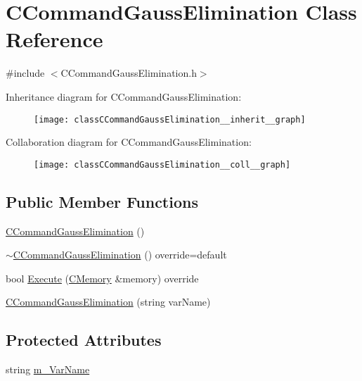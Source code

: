 \hypertarget{classCCommandGaussElimination}{}\section{C\+Command\+Gauss\+Elimination Class Reference}
\label{classCCommandGaussElimination}


{\ttfamily \#include $<$C\+Command\+Gauss\+Elimination.\+h$>$}



Inheritance diagram for C\+Command\+Gauss\+Elimination\+:\nopagebreak
\begin{figure}[H]
\begin{center}
\leavevmode
\texttt{[image: classCCommandGaussElimination\_\_inherit\_\_graph]}
\end{center}
\end{figure}


Collaboration diagram for C\+Command\+Gauss\+Elimination\+:\nopagebreak
\begin{figure}[H]
\begin{center}
\leavevmode
\texttt{[image: classCCommandGaussElimination\_\_coll\_\_graph]}
\end{center}
\end{figure}
\subsection*{Public Member Functions}
\begin{DoxyCompactItemize}
\item 
\hyperlink{classCCommandGaussElimination_aefc96f03e386afebdadef7225bba3743}{C\+Command\+Gauss\+Elimination} ()
\item 
\hyperlink{classCCommandGaussElimination_ad694b87633ac4281f102487dcc24dd07}{$\sim$\+C\+Command\+Gauss\+Elimination} () override=default
\item 
bool \hyperlink{classCCommandGaussElimination_a450365c81652a0963554944693c6e76c}{Execute} (\hyperlink{classCMemory}{C\+Memory} \&memory) override
\item 
\hyperlink{classCCommandGaussElimination_ac1610e9aeaf8b660f277fac4f5d390fc}{C\+Command\+Gauss\+Elimination} (string var\+Name)
\end{DoxyCompactItemize}
\subsection*{Protected Attributes}
\begin{DoxyCompactItemize}
\item 
string \hyperlink{classCCommandGaussElimination_a2e619e3d9fb79bca7076ab72c21c09b4}{m\+\_\+\+Var\+Name}
\end{DoxyCompactItemize}
